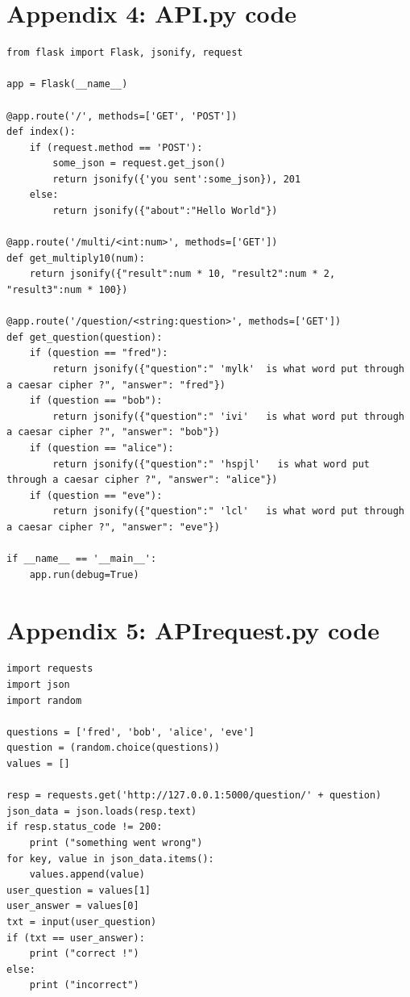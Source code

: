 \documentclass[12pt,a4paper]{article}
\begin{document}
\begin{appendices}
\section{Appendix 4: API.py code}  
\begin{lstlisting}
from flask import Flask, jsonify, request 

app = Flask(__name__) 

@app.route('/', methods=['GET', 'POST']) 
def index(): 
    if (request.method == 'POST'): 
        some_json = request.get_json()  
        return jsonify({'you sent':some_json}), 201 
    else:
        return jsonify({"about":"Hello World"}) 
    
@app.route('/multi/<int:num>', methods=['GET']) 
def get_multiply10(num): 
    return jsonify({"result":num * 10, "result2":num * 2, "result3":num * 100})   

@app.route('/question/<string:question>', methods=['GET']) 
def get_question(question):  
    if (question == "fred"):
        return jsonify({"question":" 'mylk'  is what word put through a caesar cipher ?", "answer": "fred"}) 
    if (question == "bob"):
        return jsonify({"question":" 'ivi'   is what word put through a caesar cipher ?", "answer": "bob"}) 
    if (question == "alice"):
        return jsonify({"question":" 'hspjl'   is what word put through a caesar cipher ?", "answer": "alice"}) 
    if (question == "eve"):
        return jsonify({"question":" 'lcl'   is what word put through a caesar cipher ?", "answer": "eve"})  

if __name__ == '__main__': 
    app.run(debug=True)
\end{lstlisting}
\section{Appendix 5: API\textunderscore request.py code}  
\begin{lstlisting}
import requests
import json 
import random  

questions = ['fred', 'bob', 'alice', 'eve'] 
question = (random.choice(questions)) 
values = []

resp = requests.get('http://127.0.0.1:5000/question/' + question) 
json_data = json.loads(resp.text) 
if resp.status_code != 200: 
    print ("something went wrong") 
for key, value in json_data.items(): 
    values.append(value)  
user_question = values[1] 
user_answer = values[0]   
txt = input(user_question)
if (txt == user_answer): 
    print ("correct !")  
else:
    print ("incorrect")
\end{lstlisting}

\end{appendices}
\end{document}
